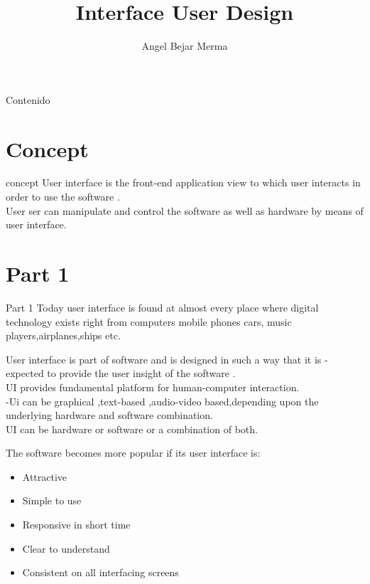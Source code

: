 \documentclass[12pt]{beamer}
\author{Angel Bejar Merma}
\title{Interface User Design}
\institute{Universidad Nacional de San Agustin}
\begin{document}
\begin{frame}
\titlepage
\end{frame}

\begin{frame}{Contenido}


\tableofcontents
\end{frame}

\section{Concept}
\begin{frame}{concept}
User interface is the front-end application view to which user interacts in order to use the software .\\
User ser can manipulate and control the software
as well as hardware by means of user interface.

\end{frame}

\section{Part 1}
\begin{frame}{Part 1}
Today  user interface is found at almost every place where digital
technology exists right from computers mobile phones cars, music players,airplanes,ships etc.

\end{frame}


\begin{frame}
User interface is part of  software and is designed in such a way that it is -expected to provide the user insight of the software .\\
UI provides fundamental platform for human-computer interaction.
\\
-Ui can be graphical ,text-based ,audio-video based,depending upon the underlying hardware and software combination.\\
UI can be hardware or software or a combination of both.
\end{frame}


\begin{frame}{}



The software becomes more popular if its user interface
is:\\
\begin{block}


    \begin{itemize}
        \item Attractive
        \item Simple to use
        \item Responsive in short time
         \item Clear to understand
         \item Consistent on all interfacing screens
    \end{itemize}

\end{block}

\end{frame}
\end{document}
